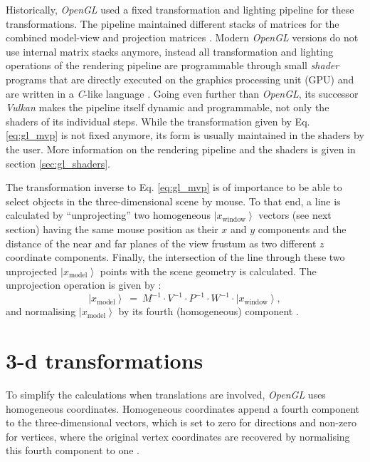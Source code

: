 Historically, \textit{OpenGL} used a fixed transformation and lighting pipeline \cite{wiki_gl_history} for
these transformations. The pipeline maintained different stacks of matrices for the combined model-view and
projection matrices \cite{web_gl_matrixmode}.
Modern \textit{OpenGL} \cite{web_OpenGL} versions do not use internal matrix stacks anymore, instead all
transformation and lighting operations of the rendering pipeline are programmable through small \textit{shader}
programs that are directly executed on the graphics processing unit (GPU) \cite{wiki_gl_history}
and are written in a \textit{C}-like language \cite{wiki_glsl}.
Going even further than \textit{OpenGL}, its successor \textit{Vulkan} \cite{web_Vulkan} makes the pipeline
itself dynamic and programmable, not only the shaders of its individual steps.
While the transformation given by Eq. \ref{eq:gl_mvp} is not fixed anymore, its form is usually maintained
in the shaders by the user. More information on the rendering pipeline and the shaders is given in 
section \ref{sec:gl_shaders}.

The transformation inverse to Eq. \ref{eq:gl_mvp} is of importance to be able to select objects in the 
three-dimensional scene by mouse. 
To that end, a line is calculated by ``unprojecting'' two homogeneous $\left|x_{\mathrm{window}}\right>$ vectors
(see next section) having the same mouse position as their $x$ and $y$ components and the distance of the
near and far planes of the view frustum as two different $z$ coordinate components.
Finally, the intersection of the line through these two unprojected $\left|x_{\mathrm{model}}\right>$ points 
with the scene geometry is calculated. 
The unprojection operation is given by \cite{web_gl_unproject}:
\begin{equation}
	\left|x_{\mathrm{model}}\right> \ =\ M^{-1} \cdot V^{-1} \cdot P^{-1} \cdot  W^{-1} \cdot  \left| x_{\mathrm{window}} \right>,
\end{equation}
and normalising $\left|x_{\mathrm{model}}\right>$ by its fourth (homogeneous) component \cite{web_gl_unproject}.



\section{3-d transformations}
\label{sec:gl_trafos}
To simplify the calculations when translations are involved, \textit{OpenGL} uses homogeneous coordinates.
Homogeneous coordinates append a fourth component to the three-dimensional vectors, which is set to zero for
directions and non-zero for vertices, where the original vertex coordinates are recovered by normalising this
fourth component to one \cite[pp. 235, 357]{Bronstein2008}.


